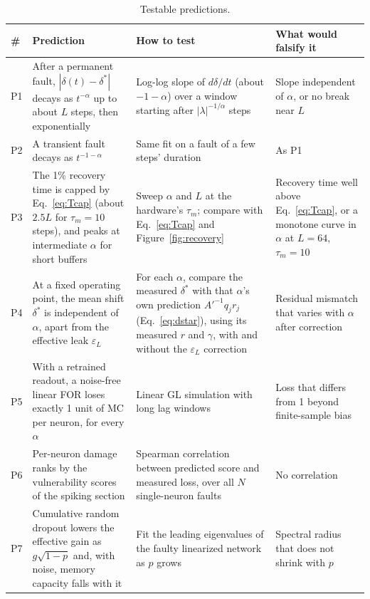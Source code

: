 \documentclass[11pt,a4paper]{article}
\begin{document}
\begin{table}[h]
\centering
\small
\begin{tabularx}{\textwidth}{@{}l>{\raggedright\arraybackslash}X>{\raggedright\arraybackslash}X>{\raggedright\arraybackslash}X@{}}
\toprule
\# & Prediction & How to test & What would falsify it \\
\midrule
P1 & After a permanent fault, $|\delta(t) - \delta^*|$ decays as $t^{-\alpha}$ up to about $L$ steps, then exponentially & Log-log slope of $d\delta/dt$ (about $-1-\alpha$) over a window starting after $|\lambda|^{-1/\alpha}$ steps & Slope independent of $\alpha$, or no break near $L$ \\
P2 & A transient fault decays as $t^{-1-\alpha}$ & Same fit on a fault of a few steps' duration & As P1 \\
P3 & The 1\% recovery time is capped by Eq.~\eqref{eq:Tcap} (about $2.5L$ for $\tau_m = 10$ steps), and peaks at intermediate $\alpha$ for short buffers & Sweep $\alpha$ and $L$ at the hardware's $\tau_m$; compare with Eq.~\eqref{eq:Tcap} and Figure~\ref{fig:recovery} & Recovery time well above Eq.~\eqref{eq:Tcap}, or a monotone curve in $\alpha$ at $L = 64$, $\tau_m = 10$ \\
P4 & At a fixed operating point, the mean shift $\delta^*$ is independent of $\alpha$, apart from the effective leak $\varepsilon_L$ & For each $\alpha$, compare the measured $\delta^*$ with that $\alpha$'s own prediction $A'^{-1} q_j r_j$ (Eq.~\ref{eq:dstar}), using its measured $r$ and $\gamma$, with and without the $\varepsilon_L$ correction & Residual mismatch that varies with $\alpha$ after correction \\
P5 & With a retrained readout, a noise-free linear FOR loses exactly 1 unit of MC per neuron, for every $\alpha$ & Linear GL simulation with long lag windows & Loss that differs from 1 beyond finite-sample bias \\
P6 & Per-neuron damage ranks by the vulnerability scores of the spiking section & Spearman correlation between predicted score and measured loss, over all $N$ single-neuron faults & No correlation \\
P7 & Cumulative random dropout lowers the effective gain as $g\sqrt{1-p}$ and, with noise, memory capacity falls with it & Fit the leading eigenvalues of the faulty linearized network as $p$ grows & Spectral radius that does not shrink with $p$ \\
\bottomrule
\end{tabularx}
\caption{Testable predictions.}
\label{tab:predictions}
\end{table}
\end{document}
